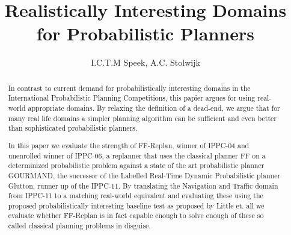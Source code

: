 \documentclass[runningheads,a4paper]{llncs}
\begin{document}
\mainmatter%

\title{Realistically Interesting Domains for Probabilistic Planners}


\author{I.C.T.M Speek, A.C. Stolwijk}

%



\maketitle


\begin{abstract}
	In contrast to current demand for probabilistically interesting domains in the International Probabilistic Planning Competitions, this papier argues for using real-world appropriate domains. By relaxing the definition of a dead-end, we argue that for many
real life domains a simpler planning algorithm can be sufficient and even better than sophisticated probabilistic planners.

In this paper we evaluate the strength of FF-Replan, winner of IPPC-04 and unenrolled winner of IPPC-06, a replanner that uses the classical planner FF on a determinized probabilistic problem against a state of the art probabilistic planner GOURMAND, the successor of the Labelled Real-Time Dynamic Probabilistic planner Glutton, runner up of the IPPC-11. By translating the Navigation and Traffic domain from IPPC-11 to a matching real-world equivalent and evaluating these using the proposed probabilistically interesting baseline test as proposed by Little et. all we evaluate whether FF-Replan is in fact capable enough to solve enough of these so called classical planning problems in disguise.
\end{abstract}
\end{document}

